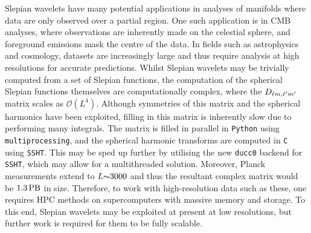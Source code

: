Slepian wavelets have many potential applications in analyses of manifolds where data are only observed over a partial region.
One such application is in CMB analyses, where observations are inherently made on the celestial sphere, and foreground emissions mask the centre of the data.
In fields such as astrophysics and cosmology, datasets are increasingly large and thus require analysis at high resolutions for accurate predictions.
Whilst Slepian wavelets may be trivially computed from a set of Slepian functions, the computation of the spherical Slepian functions themselves are computationally complex, where the \(D_{\ell{} m,\ell' m'}{}\) matrix scales as \(\mathcal{O}(L^{4})\).
Although symmetries of this matrix and the spherical harmonics have been exploited, filling in this matrix is inherently slow due to performing many integrals.
The matrix is filled in parallel in \texttt{Python} using \texttt{multiprocessing}, and the spherical harmonic transforms are computed in \texttt{C} using \texttt{SSHT}.
This may be sped up further by utilising the new \texttt{ducc0} backend for \texttt{SSHT}, which may allow for a multithreaded solution.
Moreover, Planck measurements extend to \(L {\thicksim}3000\) and thus the resultant complex matrix would be \(\SI{1.3}{\peta\byte}\) in size.
Therefore, to work with high-resolution data such as these, one requires HPC methods on supercomputers with massive memory and storage.
To this end, Slepian wavelets may be exploited at present at low resolutions, but further work is required for them to be fully scalable.
